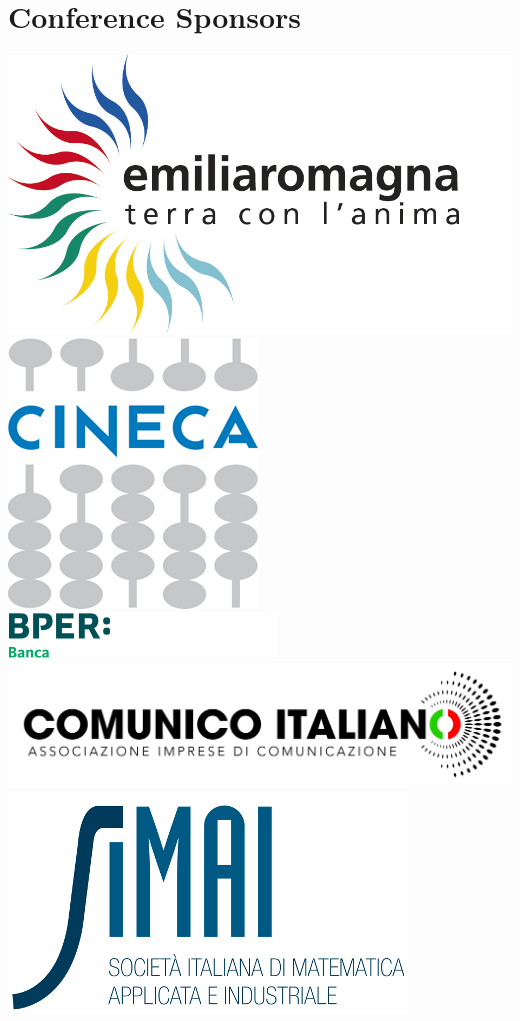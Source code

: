 \documentclass[10pt, a4paper]{book}
\begin{document}
\section*{Conference Sponsors}
\includegraphics[scale=0.25]{images/logo_APT}
\includegraphics[scale=0.4]{images/logo_CINECA}\\
\includegraphics[scale=0.5]{images/logo_BPER}
\includegraphics[scale=0.4]{images/logo_TIPO}\\
\includegraphics[scale=0.5]{images/logo_SIMAI}
\end{document}
